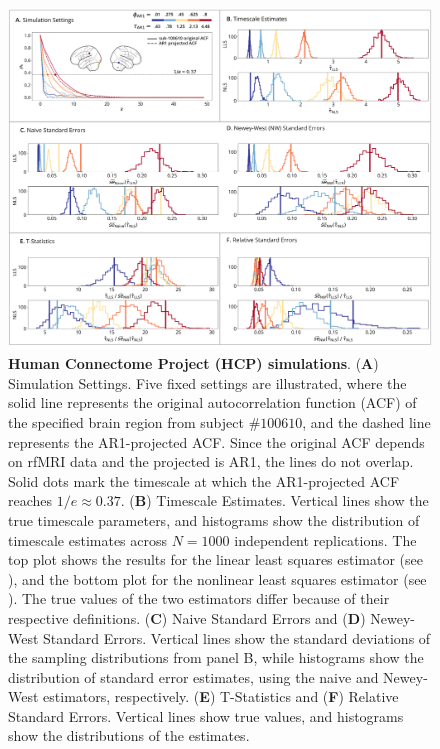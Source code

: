 \documentclass[latex/main.tex]{subfiles}
\begin{document}
\begin{figure}[H]
    \centering
    \includegraphics[width=1\textwidth]{latex/results/fig03-hcp.png} 
    \caption{
    \textbf{Human Connectome Project (HCP) simulations}.
    (\textbf{A}) Simulation Settings. Five fixed settings are illustrated, where the solid line represents the original autocorrelation function (ACF) of the specified brain region from subject $\#100610$, and the dashed line represents the AR1-projected ACF. Since the original ACF depends on rfMRI data and the projected is AR1, the lines do not overlap. Solid dots mark the timescale at which the AR1-projected ACF reaches $1/e \approx 0.37$.
    (\textbf{B}) Timescale Estimates. Vertical lines show the true timescale parameters, and histograms show the distribution of timescale estimates across $N=1000$ independent replications. The top plot shows the results for the linear least squares estimator (see ), and the bottom plot for the nonlinear least squares estimator (see ). The true values of the two estimators differ because of their respective definitions.
    (\textbf{C}) Naive Standard Errors and (\textbf{D}) Newey-West Standard Errors. Vertical lines show the standard deviations of the sampling distributions from panel B, while histograms show the distribution of standard error estimates, using the naive and Newey-West estimators, respectively.
    (\textbf{E}) T-Statistics and (\textbf{F}) Relative Standard Errors. Vertical lines show true values, and histograms show the distributions of the estimates.
    }
    \label{fig:sim-hcp}
\end{figure}
\end{document}
